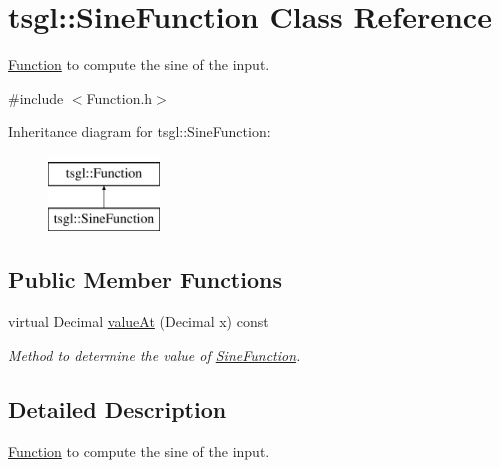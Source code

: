 \hypertarget{classtsgl_1_1_sine_function}{\section{tsgl\-:\-:Sine\-Function Class Reference}
\label{classtsgl_1_1_sine_function}
}


\hyperlink{classtsgl_1_1_function}{Function} to compute the sine of the input.  




{\ttfamily \#include $<$Function.\-h$>$}

Inheritance diagram for tsgl\-:\-:Sine\-Function\-:\begin{figure}[H]
\begin{center}
\leavevmode
\includegraphics[height=2.000000cm]{classtsgl_1_1_sine_function}
\end{center}
\end{figure}
\subsection*{Public Member Functions}
\begin{DoxyCompactItemize}
\item 
virtual Decimal \hyperlink{classtsgl_1_1_sine_function_a6507b049141d946ede1611050e44dab2}{value\-At} (Decimal x) const 
\begin{DoxyCompactList}\small\item\em Method to determine the value of \hyperlink{classtsgl_1_1_sine_function}{Sine\-Function}. \end{DoxyCompactList}\end{DoxyCompactItemize}


\subsection{Detailed Description}
\hyperlink{classtsgl_1_1_function}{Function} to compute the sine of the input. 

